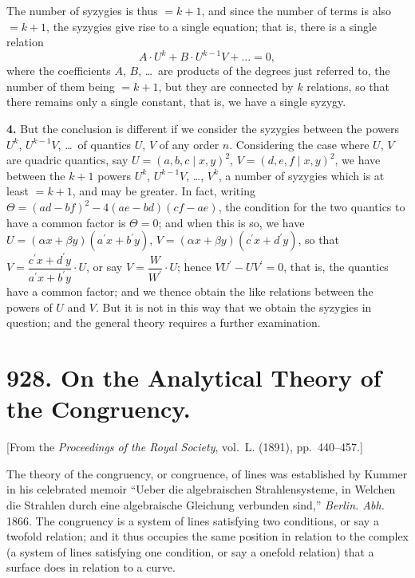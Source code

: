 \documentclass[11pt,a4paper]{book}
\begin{document}
{{{The number of syzygies is thus $= k + 1$, and since the number of terms is
also $= k + 1$, the syzygies give rise to a single equation; that is, there is a single
relation
\[
A \cdot U^k + B \cdot U^{k-1}V + \ldots = 0,
\]
where the coefficients $A$, $B$, \ldots\ are products of the degrees just referred to, the
number of them being $= k + 1$, but they are connected by $k$ relations, so that there
remains only a single constant, that is, we have a single syzygy.

\textbf{4.} But the conclusion is different if we consider the syzygies between the
powers $U^k$, $U^{k-1}V$, \ldots\ of quantics $U$, $V$ of any order $n$. Considering the case
where $U$, $V$ are quadric quantics, say $U = (a, b, c \mid x, y)^2$, $V = (d, e, f \mid x, y)^2$,
we have between the $k + 1$ powers $U^k$, $U^{k-1}V$, \ldots, $V^k$, a number of syzygies which
is at least $= k + 1$, and may be greater. In fact, writing $\Theta = (ad - bf)^2 - 4(ae - bd)(cf - ae)$,
the condition for the two quantics to have a common factor is $\Theta = 0$; and when
this is so, we have $U = (\alpha x + \beta y)(a^\prime x + b^\prime y)$, $V = (\alpha x + \beta y)(c^\prime x + d^\prime y)$,
so that $V = \dfrac{c^\prime x + d^\prime y}{a^\prime x + b^\prime y} \cdot U$, or say $V = \dfrac{W}{W^\prime} \cdot U$; hence $VU^\prime - UV^\prime = 0$,
that is, the quantics have a common factor; and we thence obtain the like relations
between the powers of $U$ and $V$. But it is not in this way that we obtain the
syzygies in question; and the general theory requires a further examination.



\newpage
\section*{928. On the Analytical Theory of the Congruency.}

[From the \textit{Proceedings of the Royal Society}, vol.~L. (1891), pp.~440--457.]

\bigskip

The theory of the congruency, or congruence, of lines was established by
Kummer in his celebrated memoir ``Ueber die algebraischen Strahlensysteme, in
Welchen die Strahlen durch eine algebraische Gleichung verbunden sind,'' \textit{Berlin.
Abh.} 1866. The congruency is a system of lines satisfying two conditions, or say
a twofold relation; and it thus occupies the same position in relation to the complex
(a system of lines satisfying one condition, or say a onefold relation) that a surface
does in relation to a curve.

}}}
\end{document}
